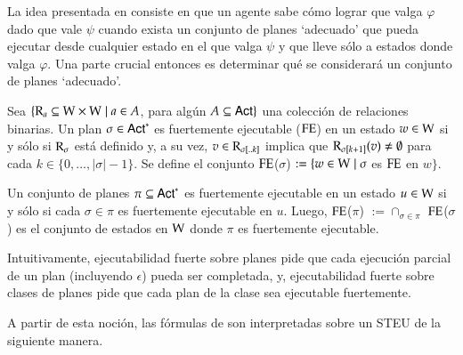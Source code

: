 La idea presentada en \cite{ArecesFSV25} consiste en que un agente sabe cómo lograr que valga $\varphi$ dado que vale $\psi$ cuando exista un 
conjunto de planes `adecuado' que pueda ejecutar desde cualquier estado en el que valga $\psi$ y que lleve sólo a estados donde valga $\varphi$. 
Una parte crucial entonces es determinar qué se considerará un conjunto de planes `adecuado'.

\begin{definicion}
    Sea $\{\mathrm{R}_a \subseteq \mathrm{W} \times \mathrm{W} \mid a \in A$, para algún $A \subseteq {\rm \sf Act}\}$ una colección de relaciones binarias. Un plan $\sigma \in {\rm \sf Act}^*$
    es fuertemente ejecutable ($\mathrm{FE}$) en un estado $w \in \mathrm{W}$ si y sólo si $\mathrm{R}_\sigma$ está definido y, a su vez, $v \in \mathrm{R}_{\sigma[..k]}$ implica que 
    $\mathrm{R}_{\sigma[k+1]}(v) \neq \emptyset$ para cada $k \in \{0,...,|\sigma|-1\}$. Se define el conjunto $\mathrm{FE}$($\sigma$) $:= \{w \in \mathrm{W} \mid \sigma$ es $\mathrm{FE}$ en $w\}$.
    
    Un conjunto de planes $\pi \subseteq {\rm \sf Act}^*$ es fuertemente ejecutable en un estado $u \in \mathrm{W}$ si y sólo si cada $\sigma \in \pi$ es fuertemente ejecutable en $u$.
    Luego, $\mathrm{FE}$($\pi$) $:= \cap_{\sigma \in \pi}$ $\mathrm{FE}$($\sigma$) es el conjunto de estados en $\mathrm{W}$ donde $\pi$ es fuertemente ejecutable. 

\end{definicion}

Intuitivamente, ejecutabilidad fuerte sobre planes pide que cada ejecución parcial de un plan (incluyendo $\epsilon$) pueda ser completada, y, ejecutabilidad fuerte sobre
clases de planes pide que cada plan de la clase sea ejecutable fuertemente.

A partir de esta noción, las fórmulas de \KHilogic son interpretadas sobre un STEU de la siguiente manera.

